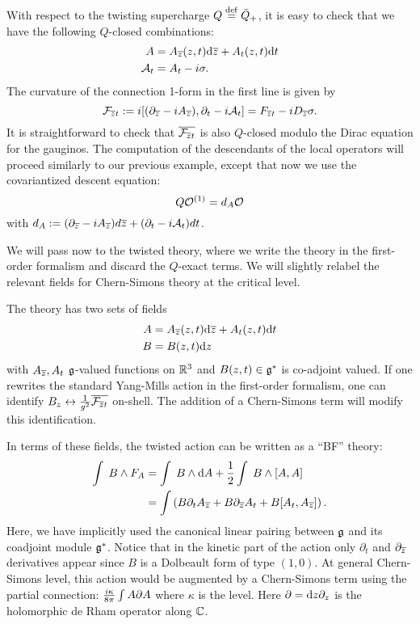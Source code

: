 \documentclass[11pt]{amsart}
\begin{document}
With respect to the twisting supercharge $Q \overset{\rm def}{=} \bar{Q}_+$, it is easy to check that we have the following $Q$-closed combinations:
\begin{align}
A & = A_{{\overline{z}}} (z,t) {\rm d} {\overline{z}} + A_{t} (z, t) {\rm d} t \\
\mathcal A_t &= A_t - i \sigma.
\end{align}
The curvature of the connection 1-form in the first line is given by
\[
\mathcal F_{{\overline{z}} t} := i  [(\partial_{{\overline{z}}} - i A_{{\overline{z}}}), \partial_t - i \mathcal A_t] = F_{{\overline{z}} t} - i D_{{\overline{z}}}\sigma.
\] It is straightforward to check that $\overline{\mathcal F_{{\overline{z}} t}}$ is also $Q$-closed modulo the Dirac equation for the gauginos. 
The computation of the descendants of the local operators will proceed similarly to our previous example, except that now we use the covariantized descent equation:
\[
Q \mathcal O^{(1)} = d_{A} \mathcal O
\] with $d_A := (\partial_{{\overline{z}}} - i A_{{\overline{z}}})d{\overline{z}} + (\partial_t - i \mathcal A_t)dt$. 

We will pass now to the twisted theory, where we write the theory in the first-order formalism and discard the $Q$-exact terms. We will slightly relabel the relevant fields for Chern-Simons theory at the critical level. 

The theory has two sets of fields
\begin{align*}
A & = A_{{\overline{z}}} (z,t) {\rm d} {\overline{z}} + A_{t} (z, t) {\rm d} t \\
B & = B (z,t) {\rm d} z 
\end{align*}
with $A_{{\overline{z}}}, A_t$ $\mathfrak g$-valued functions on $\mathbb R^3$ and $B(z,t) \in \mathfrak g^*$ is co-adjoint valued. If one rewrites the standard Yang-Mills action in the first-order formalism, one can identify $B_z \leftrightarrow {1 \over g^2} \overline{\mathcal F_{{\overline{z}} t}}$ on-shell. The addition of a Chern-Simons term will modify this identification. 


In terms of these fields, the twisted action can be written as a ``BF'' theory:
\begin{align*}
\int \; B \wedge F_A & = \int \; B \wedge {\rm d} A +  \frac12 \int \; B \wedge [A,A] \\
& = \int \left(B \partial_t A_{{\overline{z}}} + B \partial_{{\overline{z}}} A_t + B [A_t, A_{\overline{z}}]\right) .
\end{align*}
Here, we have implicitly used the canonical linear pairing between $\mathfrak g$ and its coadjoint module $\mathfrak g^*$. 
Notice that in the kinetic part of the action only $\partial_t$ and $\partial_{{\overline{z}}}$ derivatives appear since $B$ is a Dolbeault form of type $(1,0)$. At general Chern-Simons level, this action would be augmented by a Chern-Simons term using the partial connection: ${i \kappa \over 8 \pi} \int A \partial A$ where $\kappa$ is the level.
Here $\partial = {\rm d} z \partial_z$ is the holomorphic de Rham operator along $\mathbb C$. 
\end{document}
